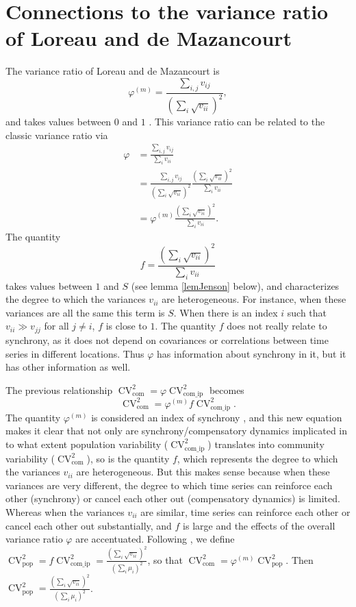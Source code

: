 \documentclass[letterpaper,11pt]{article}
\newcommand{\CV}{{\operatorname{CV}}}
\newcommand{\com}{{\operatorname{com}}}
\newcommand{\comip}{{\operatorname{com\_ip}}}
\newcommand{\pop}{{\operatorname{pop}}}
\begin{document}
\section{Connections to the variance ratio of Loreau and de Mazancourt}
\noindent The variance ratio of Loreau and de Mazancourt is 
\begin{equation}
\varphi^{(m)}=\frac{\sum_{i,j} v_{ij}}{(\sum_i \sqrt{v_{ii}})^2},
\end{equation}
and takes values between $0$ and $1$ \citep{Loreau2008}. This variance ratio 
can be related to the classic variance ratio via
\begin{align}
\varphi &= \frac{\sum_{i,j} v_{ij}}{\sum_i v_{ii}} \\
&= \frac{\sum_{i,j} v_{ij}}{(\sum_i \sqrt{v_{ii}})^2}
\frac{(\sum_i \sqrt{v_{ii}})^2}{\sum_i v_{ii}} \\
&= \varphi^{(m)} \frac{(\sum_i \sqrt{v_{ii}})^2}{\sum_i v_{ii}}.
\end{align}
The quantity 
\begin{equation}
f=\frac{(\sum_i \sqrt{v_{ii}})^2}{\sum_i v_{ii}}
\end{equation}
takes values between $1$ and $S$ (see lemma \ref{lemJenson} below), 
and characterizes the degree to which the 
variances $v_{ii}$ are heterogeneous. For instance, when these variances are all
the same this term is $S$. When there is an index $i$ such that 
$v_{ii} \gg v_{jj}$ for all $j \neq i$, $f$ is close to $1$. 
The quantity $f$ does not really relate to synchrony,
as it does not depend on covariances or correlations between time series in
different locations. Thus $\varphi$ has information
about synchrony in it, but it has other information as well.

The previous relationship $\CV_{\com}^2=\varphi \CV_{\comip}^2$ becomes 
\begin{equation}
\CV_{\com}^2=\varphi^{(m)} f \CV_{\comip}^2.
\end{equation}
The quantity $\varphi^{(m)}$ is considered an index of synchrony
\citep{Loreau2008}, and this 
new equation makes it clear that not only are synchrony/compensatory dynamics
implicated in
to what extent population variability ($\CV_{\comip}^2$) 
translates into community variability ($\CV_{\com}^2$),
so is the quantity $f$, which represents the degree to which the variances
$v_{ii}$ are heterogeneous. But this makes sense because when these variances
are very different, the degree to which time series can reinforce each other (synchrony)
or cancel each other out (compensatory dynamics) is limited. Whereas 
when the variances $v_{ii}$ are similar,
time series can reinforce each other or cancel each other out substantially,
and $f$ is large and the effects of the overall variance ratio
$\varphi$ are accentuated. Following \cite{Loreau2008}, we define
$\CV_{\pop}^2 = f \CV_{\comip}^2 = \frac{\left( \sum_i \sqrt{v_{ii}} \right)^2}{\left( \sum_i \mu_i \right)^2}$, 
so that 
$\CV_{\com}^2 = \varphi^{(m)} \CV_{\pop}^2$. Then $\CV_{\pop}^2 = \frac{\left( \sum_i \sqrt{v_{ii}} \right)^2}{\left( \sum_i \mu_i  \right)^2}$.
\end{document}
